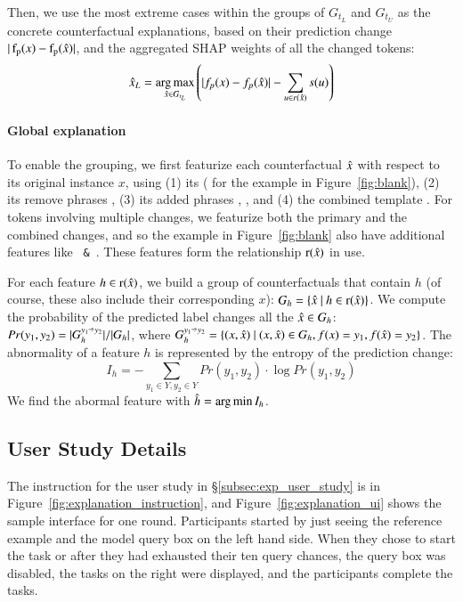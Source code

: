 Then, we use the most extreme cases within the groups of $G_{t_L}$ and $G_{t_U}$ as the concrete counterfactual explanations, based on their prediction change $|\operatorname*{f_p}(x)-\operatorname*{f_p}(\hat{x})|$, and the aggregated SHAP weights of all the changed tokens:
$$\hat{x}_L = \operatorname*{arg\,max}_{\hat{x} \in G_{t_L}} \left( |f_p(x)-f_p(\hat{x})| - \sum_{u\in r(\hat{x})} s(u) \right)$$ 



\paragraph{Global explanation}
To enable the grouping, we first featurize each counterfactual $\hat{x}$ with respect to its original instance $x$, using 
(1) its \tagstr ( for the example in Figure~\ref{fig:blank}), 
(2) its remove phrases , 
(3) its added phrases , , and 
(4) the combined template .
For tokens involving multiple changes, we featurize both the primary and the combined changes, and so the example in Figure~\ref{fig:blank} also have additional features like \texttt{ \& }.
These features form the relationship $\operatorname*{r}(\hat{x})$ in use.

For each feature $h \in \operatorname*{r}(\hat{x})$, we build a group of counterfactuals that contain $h$ (of course, these also include their corresponding $x$): $G_h = \{ \hat{x}\ |\ h\in \operatorname*{r}(\hat{x}) \}$.
We compute the probability of the predicted label changes all the $\hat{x} \in G_{h}$: $Pr(y_1, y_2) = |G_h^{y_1\veryshortarrow y_2}|/|G_h|$, where $ G_h^{y_1\veryshortarrow y_2} = \{ (x, \xp)\ |\ (x, \xp) \in G_h, f(x)=y_1, f(\xp) = y_2 \}$.
The abnormality of a feature $h$ is represented by the entropy of the prediction change:
$$I_h = -\sum_{y_1 \in Y, y_2 \in Y} Pr(y_1, y_2) \cdot \log Pr(y_1, y_2)$$
We find the abormal feature with $\hat{h} = \operatorname*{arg\,min} I_h$.



\subsection{User Study Details}
\label{appendix:exp_user_study}

The instruction for the user study in \S\ref{subsec:exp_user_study} is in Figure~\ref{fig:explanation_instruction}, and Figure~\ref{fig:explanation_ui} shows the sample interface for one round. 
Participants started by just seeing the reference example and the model query box on the left hand side.
When they chose to start the task or after they had exhausted their ten query chances, the query box was disabled, the tasks on the right were displayed, and the participants complete the tasks.